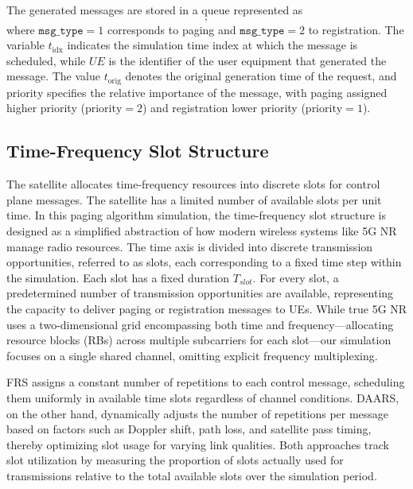 \documentclass[conference]{IEEEtran}
\begin{document}
The generated messages are stored in a queue represented as
\begin{equation}
    [\texttt{msg\_type}, \, t_{\text{idx}}, \, UE, \, t_{\text{orig}}, \, \text{priority}],
\end{equation}
where \(\texttt{msg\_type}=1\) corresponds to paging and \(\texttt{msg\_type}=2\) to registration. The variable \(t_{\text{idx}}\) indicates the simulation time index at which the message is scheduled, while \(UE\) is the identifier of the user equipment that generated the message. The value \(t_{\text{orig}}\) denotes the original generation time of the request, and \(\text{priority}\) specifies the relative importance of the message, with paging assigned higher priority (\(\text{priority}=2\)) and registration lower priority (\(\text{priority}=1\)).


\subsection{Time-Frequency Slot Structure}

The satellite allocates time-frequency resources into discrete slots for control plane messages. The satellite has a limited number of available slots per unit time. In this paging algorithm simulation, the time-frequency slot structure is designed as a simplified abstraction of how modern wireless systems like 5G NR manage radio resources. The time axis is divided into discrete transmission opportunities, referred to as slots, each corresponding to a fixed time step within the simulation. Each slot has a fixed duration $T_{slot}$. For every slot, a predetermined number of transmission opportunities are available, representing the capacity to deliver paging or registration messages to UEs. While true 5G NR uses a two-dimensional grid encompassing both time and frequency—allocating resource blocks (RBs) across multiple subcarriers for each slot—our simulation focuses on a single shared channel, omitting explicit frequency multiplexing.

 FRS assigns a constant number of repetitions to each control message, scheduling them uniformly in available time slots regardless of channel conditions. DAARS, on the other hand, dynamically adjusts the number of repetitions per message based on factors such as Doppler shift, path loss, and satellite pass timing, thereby optimizing slot usage for varying link qualities. Both approaches track slot utilization by measuring the proportion of slots actually used for transmissions relative to the total available slots over the simulation period.
\end{document}
